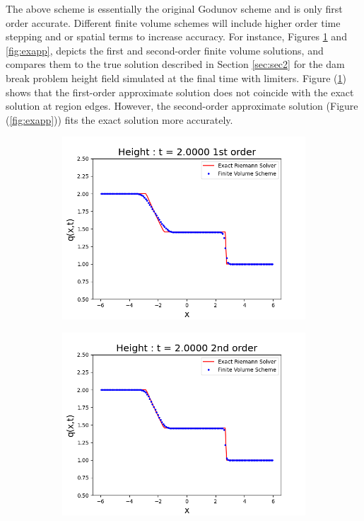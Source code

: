 \documentclass[9pt,a4paper]{article}
\newcommand{\Fig}[1]{Figure (\ref{fig:#1})}
\newcommand{\Sec}[1]{Section \ref{sec:#1}}
\begin{document}
	The above  scheme is essentially the original Godunov scheme  \citep{godunov1959difference} and is only first order accurate.  Different finite volume schemes will include higher order time stepping and or spatial terms to increase accuracy.  For instance, Figures \ref{fig:exap} and \ref{fig:exapp}, depicts the first and second-order finite volume solutions, and compares them to the true solution described in  \Sec{sec2} for the dam break problem height field simulated at the final time with limiters. \Fig{exap}  shows that the first-order approximate solution does not coincide with the exact solution at region edges. However, the second-order approximate solution (\Fig{exapp})  fits the exact solution more accurately. 
	\begin{figure}[H]
		\begin{subfigure}[b]{0.5\textwidth}
			\centering
			\includegraphics[width=1.0\linewidth]{images/exap}
			\caption{}
			\label{fig:exap}
		\end{subfigure}
		\begin{subfigure}[b]{0.5\textwidth}
			\centering
			\includegraphics[width=1.0\linewidth]{images/exapp}

\end{subfigure}
\end{figure}
\end{document}
